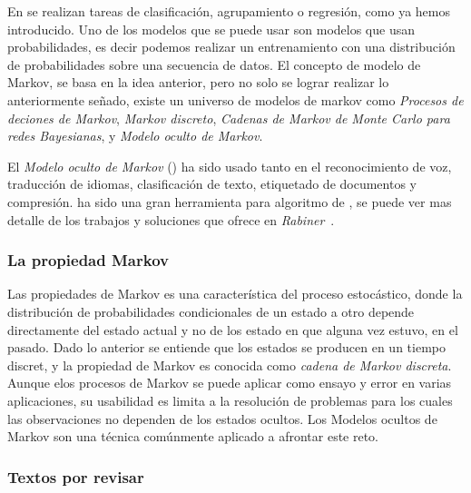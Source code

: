 En \machinelearning se realizan tareas de clasificación, agrupamiento o regresión, como ya hemos introducido. Uno de los modelos que se puede usar son modelos que usan probabilidades, es decir podemos realizar un entrenamiento con una distribución de probabilidades sobre una secuencia de datos. El concepto de modelo de Markov, se basa en la idea anterior, pero no solo se lograr realizar lo anteriormente señado, existe un universo de modelos de markov como \emph{Procesos de deciones de Markov}, \emph{Markov discreto}, \emph{Cadenas de Markov de Monte Carlo para redes Bayesianas}, y  \emph{Modelo oculto de Markov}.

El \emph{Modelo oculto de Markov} (\HMM) ha sido usado tanto en el reconocimiento de voz, traducción de idiomas, clasificación de texto, etiquetado de documentos y compresión. \HMM ha sido una gran herramienta para algoritmo de \machinelearning, se puede ver mas detalle de los trabajos y soluciones que ofrece en \emph{Rabiner}~\cite{}.





\subsubsection{La propiedad Markov}



Las propiedades de Markov es una característica del proceso estocástico, donde la distribución de probabilidades condicionales de un estado a otro depende directamente del estado actual y no de los estado en que alguna vez estuvo, en el pasado. Dado lo anterior se entiende que los estados se producen en un tiempo discret, y la propiedad de Markov es conocida como \emph{cadena de Markov discreta}. Aunque elos procesos de Markov se puede aplicar como ensayo y error en varias aplicaciones, su usabilidad es limita a la resolución de problemas para los cuales las observaciones no dependen de los estados ocultos. Los Modelos ocultos de Markov son una técnica comúnmente aplicado a afrontar este reto.






\subsubsection{Textos por revisar}



